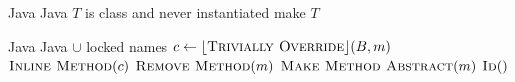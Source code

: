 \begin{algorithm}[p]
\caption{$\refactoring{Make Type Abstract}(T : \type{Type})$}
\label{alg:MakeTypeAbstract}
\begin{algorithmic}[1]
\REQUIRE Java
\ENSURE Java
\medskip
{}
    \RETURN
\ENDIF
\STATE \assert $T$ is class and never instantiated
\STATE make $T$ 
\end{algorithmic}
\end{algorithm}

\begin{algorithm}[p]
\caption{$\refactoring{Push Down Virtual Method}(m : \type{VirtualMethod})$}
\label{alg:PushDownVirtualMethod}
\begin{algorithmic}[1]
\REQUIRE Java
\ENSURE Java $\cup$ locked names
\medskip
{}
  \STATE $c \leftarrow \lfloor\textsc{Trivially Override}\rfloor(B, m)$
    \STATE $\textsc{Inline Method}(c)$
  \ENDIF
\ENDFOR
\STATE $\textsc{Remove Method}(m)$
\STATE \qquad\orelse$\textsc{Make Method Abstract}(m)$
\STATE \qquad\orelse$\textsc{Id}()$
\end{algorithmic}
\end{algorithm}
